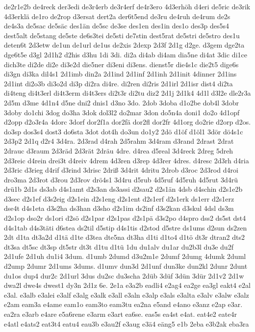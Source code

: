 {de2r1e2b
de4reck
der3edi
de3r4erb
de3r4erf
de4r3ero
4d3erhöh
d4eri
de5ric
de3rik
4d3erklä
de1ro
de2rop
d3ersat
dert2a
der6t5end
de3ru
de4ruh
de4rum
de2s
de4s3a
de5sac
de5säc
des1än
de5sc
de3se
des1en
des1in
des1o
des3p
des5s4
dest5alt
de5stang
de5ste
de6s3tei
de5sti
de7stin
dest5rat
de5stri
de5stro
des1u
deten6t
2d3etw
de1un
de1url
de1us
de2xis
2dexp
2d3f
2d1g
d2ge.
d3gem
dge2ta
dge6t5e
d3gl
2d1h2
d2his
d3hu
1di
3di.
di2a
di4ab
di4am
dia5ne
di4at
3dic
di1ce
dich3te
di2de
di2e
di3e2d
die5ner
di3eni
di3ens.
dienst5r
die4s1c
die2t5
dige6s
di3gn
di3ka
dil4s1
2d1imb
din2a
2d1ind
2d1inf
2d1inh
2d1init
4dinner
2d1ins
2d1int
di2o3b
di3o2d
di3p
di2ra
di4re.
di2ren
di2ris
2d1irl
2d1isr
dist4
di2ta
di4teng
di4t3erl
di4t3erm
di4t3ers
di2t3r
di2tu
diz2
2d1j
2d1k4
4d1l
d3l2e
dle2r3a
2d5m
d3me
4d1n4
d5ne
dni2
dnis1
d3no
3do.
2dob
3doba
d1o2be
dob4l
3dobr
3doby
do1chi
3dog
do3ha
3dok
dol3l2
do2mar
3don
do5n4a
doni1
do2o
4d1opf
d2opp
d2o3r4a
4dorc
3dorf
dor2f1a
dor2fä
dor2fl
dor2fr
4d1org
do2rie
d2orp
d2os.
do3sp
dos3s4
dost3
do6sta
3dot
dot4h
do3un
do1y2
2dö
d1öf
d1öl1
3dör
dö4s1c
2d3p2
2d1q
d2r4
3d4ra.
2d3rad
d4rah
2d5rahm
3d4ram
d3rand
2drast
2drat
2drauc
d3raum
2d3räd
2d3rät
2dräu
4dre.
d4rea
d5real
3d4reck
2dreg
5dreh
2d3reic
d4rein
drei3t
d4reiv
4drem
4d3ren
d3rep
4d3rer
4dres.
d4resc
2d3rh
d4ria
2d3ric
d3rieg
d4rif
d3rind
3drisc
2driß
3d4rit
4dritu
2drob
d3roc
2d3rod
d4roi
dro3ma
2d3rot
d3rou
2d3rov
drö4s1
3d4ru
d5rub
4d5ruf
4d5ruh
4d5rut
3d4rü
drü1b
2d1s
ds3ab
d4s1amt
d2s3an
ds3assi
d2sau2
d2s1än
4dsb
d4schin
d2s1e2b
d3sec
d2s1ef
d3s2eig
d2s1ein
d2s1eng
d2s1ent
d2s1erf
d2s1erk
ds1err
d2s1erz
dse4t
d4s1eta
d3s2ha
ds3han
d3sho
d2s1im
ds2inf
d3s2kan
d3skul
4dsl
ds3m
d2s1op
dso2r
ds1ori
d2sö
d2s1par
d2s1pas
d2s1pä
d3s2po
d4spro
dss2
ds5st
dst4
d4s1tab
d4s3täti
d6stea
ds2til
d5stip
d4s1tis
d2stod
d5stre
ds1ums
d2sun
ds2zen
2dt
d1ta
dt3a2d
d1tä
d1te
d3tea
dte5na
dt3ha
d1ti
d1to4
d1tö
dt3r
dtran2
dts2
dt3sa
dt5sc
dt3sp
dt5str
dt3t
d1tu
d1tü
1du
du1alv
du1ar
du2b3l
du3e
du2f
2d1ufe
2d1uh
du1i4
3dum.
d1umb
2dumd
d3u2m1e
2dumf
2dumg
4dumk
2duml
d2ump
2dumr
2d1ums
3dums.
d1umv
dun3d
2d1unf
dun3ke
dun2kl
2dunr
2dunt
du1os
dup4
dur2c
2d1url
3dus
du2sc
du3scha
2düb
3düf
3dün
3dür
2d1v2
2d1w
dwa2l
dwe4s
dwest1
dy3n
2d1z
6e.
2e1a
e3a2b
eadli4
e2ag4
ea2ge
ea3gl
eakt4
e2al
e3al.
e3alb
e3alei
e3alf
e3alg
e3alk
e3all
e3aln
e3alp
e3als
e3alta
e3alv
e3alw
e3alz
e2am
eam3a
e4ame
eam1o
eam3to
eam3tu
ea2na
e5and
e4ano
e3anz
e2ap
e3ar.
ea2ra
e3arb
e4are
e5a6rene
e3arm
e3art
ea6se.
eas5s
ea4st
e4at.
eat4e2
eate4r
e4atl
e4ats2
eat3t4
eatu4
eau3b
e3au2f
e3aug
e3ä4
eäng5
e1b
2eba
e3b2ak
eba3ra
}
